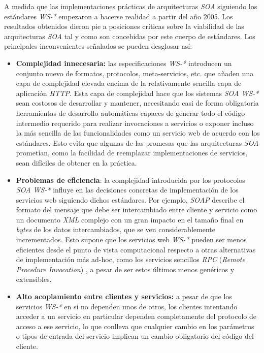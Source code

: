 A medida que las implementaciones pr\'acticas de arquitecturas \textit{SOA} siguiendo los est\'andares \textit{WS-*} empezaron a hacerse realidad a partir del a\~no 2005. Los resultados obtenidos dieron pie a posiciones cr\'iticas sobre la viabilidad de las arquitecturas \textit{SOA} tal y como son concebidas por este cuerpo de est\'andares. Los principales inconvenientes se\~nalados se pueden desglosar as\'i:

\begin{itemize}

\item \textbf{Complejidad innecesaria:} las especificaciones \textit{WS-*} introducen un conjunto nuevo de formatos, protocolos, meta-servicios, etc. que  a\~naden una capa de complejidad elevada encima de la relativamente sencilla capa de aplicaci\'on \textit{HTTP}. Esta capa de complejidad hace que los sistemas \textit{SOA WS-*} sean costosos de desarrollar y mantener, necesitando casi de forma obligatoria herramientas de desarrollo autom\'aticas capaces de generar todo el c\'odigo intermedio requerido para realizar invocaciones a servicios o exponer incluso la m\'as sencilla de las funcionalidades como un servicio web de acuerdo con los est\'andares. Esto evita que algunas de las promesas que las arquitecturas \textit{SOA} promet\'ian, como la facilidad de reemplazar implementaciones de servicios, sean dif\'iciles de obtener en la pr\'actica. 

\item \textbf{Problemas de eficiencia}: la complejidad introducida por los protocolos \textit{SOA WS-*} influye en las decisiones concretas de implementaci\'on de los servicios web siguiendo dichos est\'andares. Por ejemplo, \textit{SOAP} describe el formato del mensaje que debe ser intercambiado entre cliente y servicio como un documento \textit{XML} complejo con un gran impacto en el tama\~no final en \textit{bytes} de los datos intercambiados, que se ven considerablemente incrementados. Esto supone que los servicios web \textit{WS-*} pueden ser menos eficientes desde el punto de vista computacional respecto a otras alternativas de implementaci\'on m\'as ad-hoc, como los servicios sencillos \textit{RPC} (\textit{Remote Procedure Invocation}) \cite{xmlrpc}, a pesar de ser estos \'ultimos menos gen\'ericos y extensibles.

\item \textbf{Alto acoplamiento entre clientes y servicios:} a pesar de que los servicios \textit{WS-*} en s\'i no dependen unos de otros, los clientes intentando acceder a un servicio en particular dependen completamente del protocolo de acceso a ese servicio, lo que conlleva que  cualquier cambio en los par\'ametros o tipos de entrada del servicio implican un cambio obligatorio del c\'odigo del cliente.

\end{itemize}

